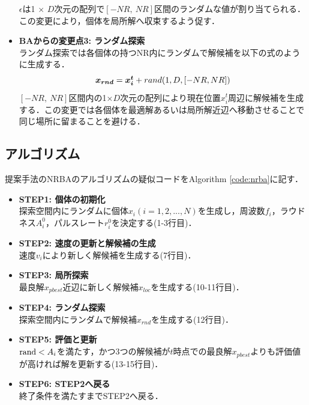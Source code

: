 \documentclass[a4j,11pt]{jarticle}
\begin{document}
\begin{itemize}
$\epsilon$は1 $\times$ $D$次元の配列で$[-NR, \ NR]$区間のランダムな値が割り当てられる．この変更により，個体を局所解へ収束するよう促す．
\item {\bf BAからの変更点3: ランダム探索} \\
ランダム探索では各個体の持つNR内にランダムで解候補を以下の式のように生成する．
\begin{equation}
\label{eq:nrrnd}
\mbox{\boldmath $x_{rnd}$}=\mbox{\boldmath $x_i^t$} + rand(1,D,[-NR, NR])
\end{equation}
$[-NR, \ NR]$区間内の1×$D$次元の配列により現在位置$x_i^t$周辺に解候補を生成する．この変更では各個体を最適解あるいは局所解近辺へ移動させることで同じ場所に留まることを避ける．
\end{itemize}

\subsection{アルゴリズム}
\label{ss:NRBA-algorithm}
提案手法のNRBAのアルゴリズムの疑似コードをAlgorithm \ref{code:nrba}に記す．

\begin{itemize}
\item {\bf STEP1: 個体の初期化}\\
探索空間内にランダムに個体$x_i (i=1,2,...,N)$を生成し，周波数$f_i$，ラウドネス$A_i^0$，パルスレート$r_i^0$を決定する(1-3行目)．
\item {\bf STEP2: 速度の更新と解候補の生成}\\
速度$v_i$により新しく解候補を生成する(7行目)．
\item {\bf STEP3: 局所探索}\\
最良解$x_{pbest}$近辺に新しく解候補$x_{loc}$を生成する(10-11行目)．
\item {\bf STEP4: ランダム探索}\\
探索空間内にランダムで解候補$x_{rnd}$を生成する(12行目)．
\item {\bf STEP5: 評価と更新}\\
${\rm rand} < A_i$を満たす，かつ3つの解候補が$t$時点での最良解$x_{pbest}$よりも評価値が高ければ解を更新する(13-15行目)．
\item {\bf STEP6: STEP2へ戻る}\\
終了条件を満たすまでSTEP2へ戻る．
\end{itemize}
\end{document}
